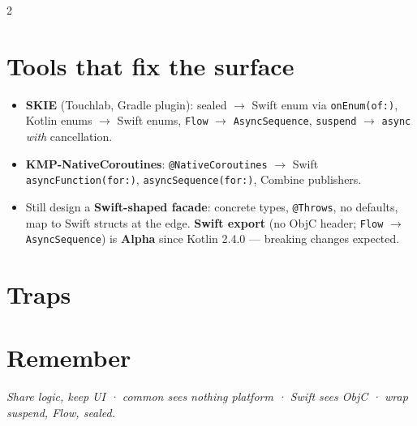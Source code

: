 \documentclass[8pt]{extarticle}
\begin{document}
\begin{multicols}{2}
\section{Tools that fix the surface}
\begin{itemize}\raggedright
  \item \textbf{SKIE} (Touchlab, Gradle plugin): sealed $\to$ Swift enum via
        \texttt{onEnum(of:)}, Kotlin enums $\to$ Swift enums, \texttt{Flow} $\to$
        \texttt{AsyncSequence}, \texttt{suspend} $\to$ \texttt{async} \emph{with}
        cancellation.
  \item \textbf{KMP-NativeCoroutines}: \texttt{@NativeCoroutines} $\to$ Swift
        \texttt{asyncFunction(for:)}, \texttt{asyncSequence(for:)}, Combine publishers.
  \item Still design a \textbf{Swift-shaped facade}: concrete types, \texttt{@Throws},
        no defaults, map to Swift structs at the edge. \textbf{Swift export} (no ObjC
        header; \texttt{Flow} $\to$ \texttt{AsyncSequence}) is \textbf{Alpha} since Kotlin
        2.4.0 — breaking changes expected.
\end{itemize}

\section{Traps}
\begin{itemize}\raggedright
\end{itemize}

\section{Remember}
\emph{Share logic, keep UI · common sees nothing platform · Swift sees ObjC · wrap
suspend, Flow, sealed.}


\end{multicols}

\end{document}
